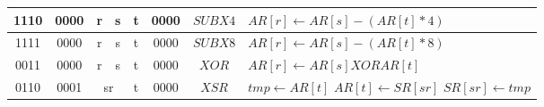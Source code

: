 \begin{smalltables}
\begin{longtable}{llllllllllllllllllllllll  p{1cm}  p{6cm} | }
		\multicolumn{4}{|c|}{1110} & \multicolumn{4}{c|}{0000} & \multicolumn{4}{c|}{r} & \multicolumn{4}{c|}{s} & \multicolumn{4}{c|}{t} & \multicolumn{4}{c|}{0000} & \multicolumn{1}{c|}{$SUBX4$} & $AR[r] \leftarrow AR[s] - (AR[t]*4)$ \\ \hline        
		\multicolumn{4}{|c|}{1111} & \multicolumn{4}{c|}{0000} & \multicolumn{4}{c|}{r} & \multicolumn{4}{c|}{s} & \multicolumn{4}{c|}{t} & \multicolumn{4}{c|}{0000} & \multicolumn{1}{c|}{$SUBX8$} & $AR[r] \leftarrow AR[s] - (AR[t]*8)$ \\ \hline
		\multicolumn{4}{|c|}{0011} & \multicolumn{4}{c|}{0000} & \multicolumn{4}{c|}{r} & \multicolumn{4}{c|}{s} & \multicolumn{4}{c|}{t} & \multicolumn{4}{c|}{0000} & \multicolumn{1}{c|}{$XOR$} & $AR[r] \leftarrow AR[s] XOR AR[t]$ \\ \hline
		\multicolumn{4}{|c|}{0110} & \multicolumn{4}{c|}{0001} & \multicolumn{8}{c|}{sr} & \multicolumn{4}{c|}{t} & \multicolumn{4}{c|}{0000} & \multicolumn{1}{c|}{$XSR$} & $tmp \leftarrow AR[t]$ \newline $AR[t] \leftarrow SR[sr]$ \newline $SR[sr] \leftarrow tmp$ \\ \hline
	\end{longtable}


\end{smalltables}
